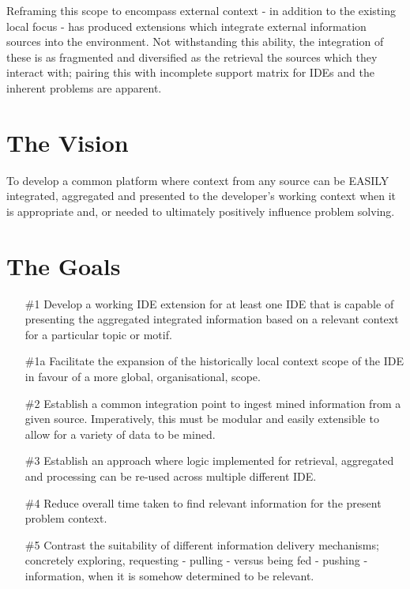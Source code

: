 Reframing this scope to encompass external context - in addition to the existing local focus - has produced extensions which integrate external information sources into the environment. Not withstanding this ability, the integration of these is as fragmented and diversified as the retrieval the sources which they interact with; pairing this with incomplete support matrix for IDEs and the inherent problems are apparent. 



\section{The Vision}

To develop a common platform where context from any source can be EASILY integrated, aggregated and presented to the developer's working context when it is appropriate and, or needed to ultimately positively influence problem solving. 

\section{The Goals}

\begin{enumerate}
	\item[\#1] Develop a working IDE extension for at least one IDE that is capable of presenting the aggregated integrated information based on a relevant context for a particular topic or motif. 
	
	\item[\#1a] Facilitate the expansion of the historically local context scope of the IDE in favour of a more global, organisational, scope.
	
	\item[\#2] Establish a common integration point to ingest mined information from a given source. Imperatively, this must be modular and easily extensible to allow for a variety of data to be mined.
	
	\item[\#3] Establish an approach where logic implemented for retrieval, aggregated and processing can be re-used across multiple different IDE.
	
	\item[\#4] Reduce overall time taken to find relevant information for the present problem context.
	
	\item[\#5] Contrast the suitability of different information delivery mechanisms; concretely exploring, requesting - pulling - versus being fed - pushing - information, when it is somehow determined to be relevant. 
	
\end{enumerate}